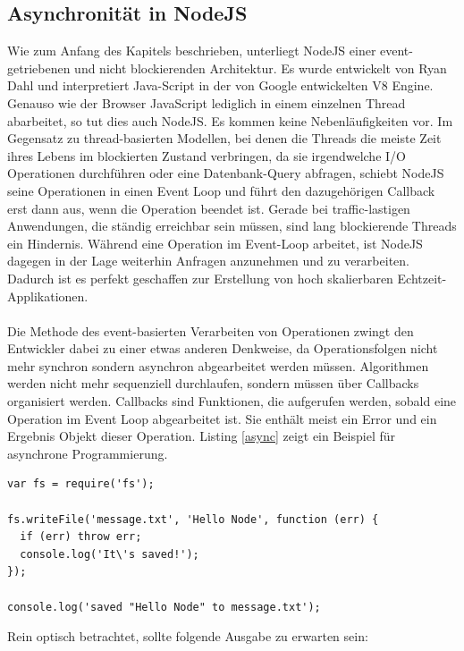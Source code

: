 \subsection{Asynchronität in NodeJS}

Wie zum Anfang des Kapitels beschrieben, unterliegt NodeJS einer event-getriebenen und nicht blockierenden Architektur. Es wurde entwickelt von Ryan Dahl und interpretiert Java-Script in der von Google entwickelten V8 Engine. Genauso wie der Browser JavaScript lediglich in einem einzelnen Thread abarbeitet, so tut dies auch NodeJS. Es kommen keine Nebenläufigkeiten vor. Im Gegensatz zu thread-basierten Modellen, bei denen die Threads die meiste Zeit ihres Lebens im blockierten Zustand verbringen, da sie irgendwelche I/O Operationen durchführen oder eine Datenbank-Query abfragen, schiebt NodeJS seine Operationen in einen Event Loop und führt den dazugehörigen Callback erst dann aus, wenn die Operation beendet ist. Gerade bei traffic-lastigen Anwendungen, die ständig erreichbar sein müssen, sind lang blockierende Threads ein Hindernis. Während eine Operation im Event-Loop arbeitet, ist NodeJS dagegen in der Lage weiterhin Anfragen anzunehmen und zu verarbeiten. Dadurch ist es perfekt geschaffen zur Erstellung von hoch skalierbaren Echtzeit-Applikationen.\\
\\
Die Methode des event-basierten Verarbeiten von Operationen zwingt den Entwickler dabei zu einer etwas anderen Denkweise, da Operationsfolgen nicht mehr synchron sondern asynchron abgearbeitet werden müssen. Algorithmen werden nicht mehr sequenziell durchlaufen, sondern müssen über Callbacks organisiert werden. Callbacks sind Funktionen, die aufgerufen werden, sobald eine Operation im Event Loop abgearbeitet ist. Sie enthält meist ein Error und ein Ergebnis Objekt dieser Operation. Listing \ref{async} zeigt ein Beispiel für asynchrone Programmierung.

\vspace{0.6cm}
\begin{lstlisting}[caption=Speichern eines Strings in eine Datei in NodeJS,label=async]
var fs = require('fs');

fs.writeFile('message.txt', 'Hello Node', function (err) {
  if (err) throw err;
  console.log('It\'s saved!');
});

console.log('saved "Hello Node" to message.txt');
\end{lstlisting}

Rein optisch betrachtet, sollte folgende Ausgabe zu erwarten sein:

